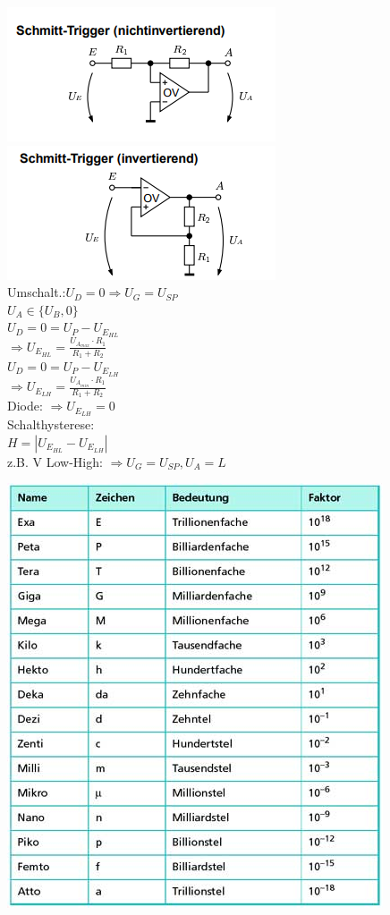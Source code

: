\documentclass[11pt]{article}
\begin{document}
\begin{minipage}{0.33\textwidth}
\includegraphics[scale=0.40]{NISTOV.png}\\
\includegraphics[scale=0.40]{ISTOV.png}\\
Umschalt.:$U_D = 0 \Rightarrow U_G = U_{SP}$\\
$U_A \in \{U_B,0\}$\\
$U_D = 0 = U_P - U_{E_{HL}}$\\
\phantom{sssi}$\Rightarrow U_{E_{HL}} = \frac{U_{A_{max}} \cdot R_1}{R_1 + R_2}$\\
$U_D = 0 = U_P - U_{E_{LH}}$\\
\phantom{sssi}$\Rightarrow U_{E_{LH}}= \frac{ U_{A_{min}} \cdot R_1}{R_1 + R_2}$\\
Diode: $\Rightarrow U_{E_{LH}} = 0$\\
Schalthysterese:\\
\phantom{sssssi} $H = |U_{E_{HL}} - U_{E_{LH}}|$\\
z.B. V Low-High: $\Rightarrow U_G = U_{SP}, U_A=L$

\includegraphics[scale=0.40]{Zehnerpotenzen.jpg}

\end{minipage}%
\end{document}
